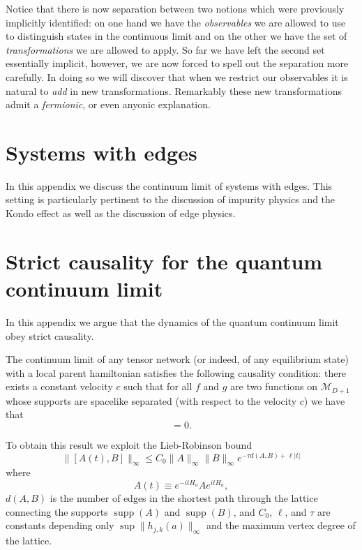 \documentclass[prl,twocolumn,lengthcheck,superscriptaddress]{revtex4-1}
\newcommand{\supp}{\operatorname{supp}}
\theoremstyle{definition}
\theoremstyle{remark}
\begin{document}
Notice that there is now separation between two notions which were previously implicitly identified: on one hand we have the \emph{observables} we are allowed to use to distinguish states in the continuous limit and on the other we have the set of \emph{transformations} we are allowed to apply. So far we have left the second set essentially implicit, however, we are now forced to spell out the separation more carefully. In doing so we will discover that when we restrict our observables it is natural to \emph{add} in new transformations. Remarkably these new transformations admit a \emph{fermionic}, or even {anyonic} explanation.




\section{Systems with edges}
In this appendix we discuss the continuum limit of systems with edges. This setting is particularly pertinent to the discussion of impurity physics and the Kondo effect as well as the discussion of edge physics. 


\section{Strict causality for the quantum continuum limit}
In this appendix we argue that the dynamics of the quantum continuum limit obey strict causality. 

The continuum limit of any tensor network (or indeed, of any equilibrium state) with a local parent hamiltonian satisfies the following causality condition: there exists a constant velocity $c$ such that for all $f$ and $g$ are two functions on $\mathcal{M}_{D+1}$ whose supports are spacelike separated (with respect to the velocity $c$) we have that
\begin{equation}
	[\widehat{\phi}(f), \widehat{\phi}(g)]  = 0.
\end{equation}

To obtain this result we exploit the Lieb-Robinson bound
\begin{equation}
	\| [A(t), B] \|_{\infty} \le C_0 \|A\|_\infty \|B\|_\infty e^{-{\tau} d(A,B) + \ell |t|}
\end{equation}
where
\begin{equation}
	A(t) \equiv e^{-itH_a} A e^{itH_a},
\end{equation} 
$d(A,B)$ is the number of edges in the shortest path through the lattice connecting the supports $\supp(A)$ and $\supp(B)$, and $C_0$, $\ell$, and $\tau$ are constants depending only $\sup \|h_{j,k}(a)\|_\infty$ and the maximum vertex degree of the lattice.
\end{document}
